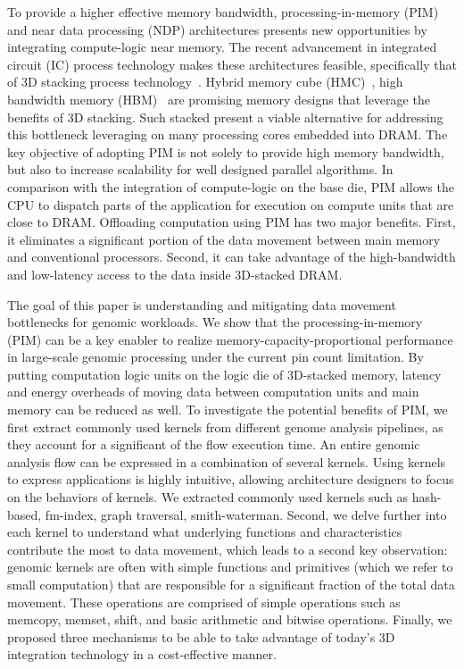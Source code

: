 To provide a higher effective memory bandwidth, processing-in-memory (PIM) and near data processing (NDP) architectures presents new opportunities by integrating compute-logic near memory. 
The recent advancement in integrated circuit (IC) process technology makes these architectures feasible, specifically that of 3D stacking process technology~\cite{zhu2013accelerating,Neurocube,GraphPIM,3Dstacking}.
Hybrid memory cube (HMC)~\cite{HMCSpec}, high bandwidth memory (HBM)~\cite{HBMSpec} are promising memory designs that leverage the benefits of 3D stacking. Such stacked present a viable alternative for addressing this bottleneck leveraging on many processing cores embedded into DRAM. The key objective of adopting PIM is not solely to provide high memory bandwidth, but also to increase scalability for well designed parallel algorithms. In comparison with the integration of compute-logic on the base die, PIM allows the CPU to dispatch parts of the application for execution on compute units that are close to DRAM. Offloading computation using PIM has two major benefits. First, it eliminates a significant portion of the data movement between main memory and conventional processors. Second, it can take advantage of the high-bandwidth and low-latency access to the data inside 3D-stacked DRAM.

The goal of this paper is understanding and mitigating data movement bottlenecks for genomic workloads. We show that the processing-in-memory (PIM) can be a key enabler to realize memory-capacity-proportional performance in large-scale genomic processing under the current pin count limitation. By putting computation logic units on the logic die of 3D-stacked memory, latency and energy overheads of moving data between computation units and main memory can be reduced as well. To investigate the potential benefits of PIM, we first extract commonly used kernels from different genome analysis pipelines, as they account for a significant of the flow execution time. An entire genomic analysis flow can be expressed in a combination of several kernels. Using kernels to express applications is highly intuitive, allowing architecture designers to focus on the behaviors of kernels. We extracted commonly used kernels such as hash-based, fm-index, graph traversal, smith-waterman. Second, we delve further into each kernel to understand what underlying functions and characteristics contribute the most to data movement, which leads to a second key observation: genomic kernels are often with simple functions and primitives (which we refer to small computation) that are responsible for a significant fraction of the total data movement. These operations are comprised of simple operations such as memcopy, memset, shift, and basic arithmetic and bitwise operations. Finally, we proposed three mechanisms to be able to take advantage of today's 3D integration technology in a cost-effective manner. 

